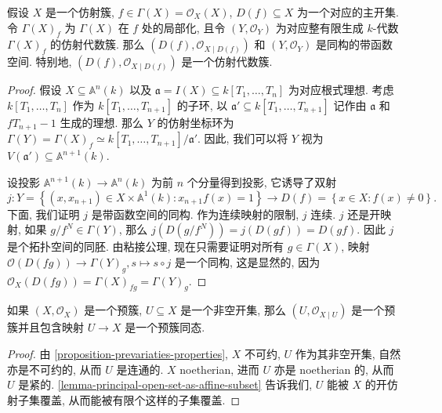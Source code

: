 \begin{lemma}
  \label{lemma-principal-open-set-as-affine-subset}
  假设 \( X \) 是一个仿射簇, \( f \in \Gamma(X) = \mathscr{O}_X(X) \), \( D(f)
  \subseteq X \) 为一个对应的主开集. 令 \( \Gamma(X)_f \) 为 \( \Gamma(X) \) 在
  \( f \) 处的局部化, 且令 \( (Y, \mathscr{O}_Y) \) 为对应整有限生成 \( k
  \)-代数 \( \Gamma(X)_f \) 的仿射代数簇. 那么 \( (D(f), \mathscr{O}_{X \mid
  D(f)}) \) 和 \( (Y, \mathscr{O}_Y) \) 是同构的带函数空间. 特别地, \( (D(f),
  \mathscr{O}_{X \mid D(f)}) \) 是一个仿射代数簇.
\end{lemma}
\begin{proof}
  假设 \( X \subseteq \mathbb{A}^n(k) \) 以及 \( \mathfrak{a} = I(X) \subseteq
  k[T_1, \ldots, T_n] \) 为对应根式理想. 考虑 \( k[T_1, \ldots, T_n] \) 作为 \(
  k[T_1, \ldots, T_{n + 1}]\) 的子环, 以 \( \mathfrak{a}' \subseteq k[T_1,
  \ldots, T_{n+ 1}] \) 记作由 \( \mathfrak{a} \) 和 \( fT_{n + 1} - 1 \)
  生成的理想. 那么 \( Y \) 的仿射坐标环为 \( \Gamma(Y) = \Gamma(X)_f \simeq
  k[T_1, \ldots, T_{n + 1}] / \mathfrak{a}' \). 因此, 我们可以将 \( Y \) 视为 \(
  V(\mathfrak{a}') \subseteq \mathbb{A}^{n + 1}(k) \).

  设投影 \( \mathbb{A}^{n + 1}(k) \to \mathbb{A}^n(k) \) 为前 \( n \)
  个分量得到投影, 它诱导了双射
  \[
    j: Y = \left\lbrace (x, x_{n + 1}) \in X \times \mathbb{A}^1(k): x_{n +
    1}f(x) = 1 \right\rbrace \to D(f) = \left\lbrace x \in X: f(x) \neq 0
    \right\rbrace.
  \]
  下面, 我们证明 \( j \) 是带函数空间的同构. 作为连续映射的限制, \( j \) 连续.
  \( j \) 还是开映射, 如果 \( g / f^N \in \Gamma(Y) \), 那么 \( j(D(g / f^N)) =
  j(D(gf)) = D(gf) \). 因此 \( j \) 是个拓扑空间的同胚. 由粘接公理,
  现在只需要证明对所有 \( g \in \Gamma(X) \), 映射 \( \mathscr{O}(D(fg)) \to
  \Gamma(Y)_g, s \mapsto s \circ j \) 是一个同构, 这是显然的, 因为 \(
  \mathscr{O}_X(D(fg)) = \Gamma(X)_{fg} = \Gamma(Y)_g \).
\end{proof}

\begin{proposition}
  如果 \( (X, \mathscr{O}_X) \) 是一个预簇, \( U \subseteq X \) 是一个非空开集,
  那么 \( (U, \mathscr{O}_{X \mid U}) \) 是一个预簇并且包含映射 \( U \to X \)
  是一个预簇同态.
\end{proposition}
\begin{proof}
  由 \cref{proposition-prevariaties-properties}, \( X \) 不可约, \( U \)
  作为其非空开集, 自然亦是不可约的, 从而 \( U \) 是连通的. \( X \) noetherian,
  进而 \( U \) 亦是 noetherian 的, 从而 \( U \) 是紧的.
  \cref{lemma-principal-open-set-as-affine-subset} 告诉我们, \( U \) 能被 \( X
  \) 的开仿射子集覆盖, 从而能被有限个这样的子集覆盖.
\end{proof}

